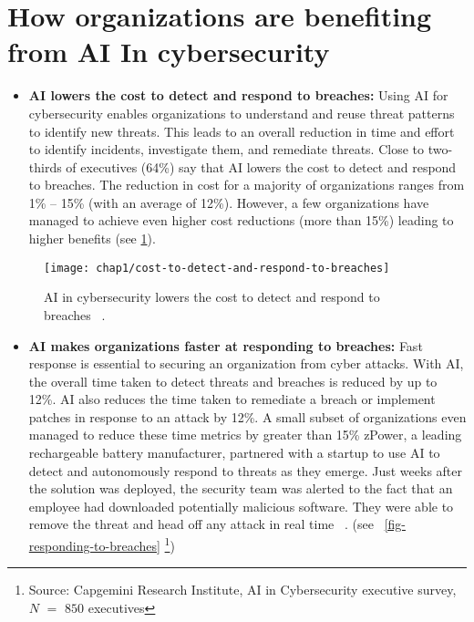 \section{How organizations are benefiting from AI In cybersecurity}

\begin{itemize}
   \item {
      \textbf{AI lowers the cost to detect and respond to breaches:} Using AI for cybersecurity enables organizations to understand and reuse 
      threat patterns to identify new threats. This leads to an overall reduction in time and effort to identify incidents, investigate them, and remediate threats.
      Close to two-thirds of executives (64\%) say that AI lowers the cost to detect and respond to breaches. The reduction in cost for a majority of organizations ranges from 1\% – 15\% (with an average of 12\%). 
      However, a few organizations have managed to achieve even higher cost reductions (more than 15\%) leading to higher benefits (see \ref{fig-cost-to-detect-and-respond-to-breaches}).
      }
\end{itemize}

\begin{figure}[h]
   \center
   \texttt{[image: chap1/cost-to-detect-and-respond-to-breaches]} 
   \caption{AI in cybersecurity lowers the cost to detect and respond to breaches ~\cite{Capgemini2019}.}
   \label{fig-cost-to-detect-and-respond-to-breaches}
\end{figure}

\begin{itemize}
   \item {
      \textbf{AI makes organizations faster at responding to breaches:}
      Fast response is essential to securing an organization from cyber attacks. With AI, the overall time taken to detect threats and breaches is reduced by up to 12\%. 
      AI also reduces the time taken to remediate a breach or implement patches in response to an attack by 12\%. A small subset of organizations even managed to reduce these time metrics by greater than 15\%
      zPower, a leading rechargeable battery manufacturer, partnered with a startup to use AI to detect and autonomously respond to threats as they emerge. Just weeks after the solution was deployed, 
      the security team was alerted to the fact that an employee had downloaded potentially malicious software. They were able to remove the threat and head off any attack in real time ~\cite{Darktrace2017}.
      (see ~\ref{fig-responding-to-breaches} \footnote{Source: Capgemini Research Institute, AI in Cybersecurity executive survey, $N$ $=$ $850$ executives})
      }
\end{itemize}

